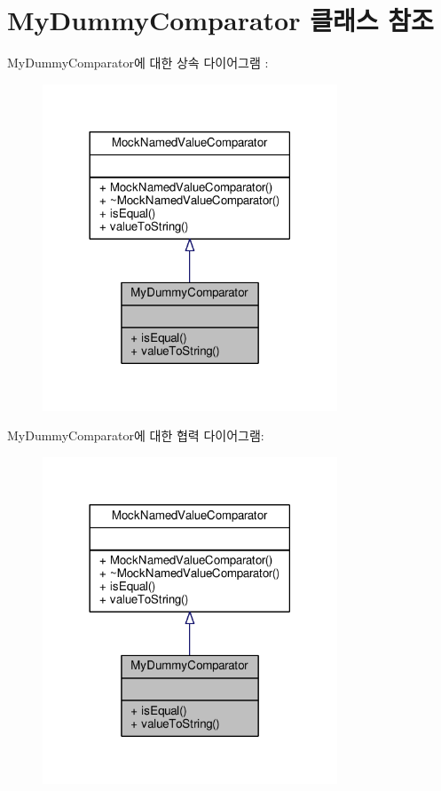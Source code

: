 \hypertarget{class_my_dummy_comparator}{}\section{My\+Dummy\+Comparator 클래스 참조}
\label{class_my_dummy_comparator}


My\+Dummy\+Comparator에 대한 상속 다이어그램 \+: 
\nopagebreak
\begin{figure}[H]
\begin{center}
\leavevmode
\includegraphics[width=249pt]{class_my_dummy_comparator__inherit__graph}
\end{center}
\end{figure}


My\+Dummy\+Comparator에 대한 협력 다이어그램\+:
\nopagebreak
\begin{figure}[H]
\begin{center}
\leavevmode
\includegraphics[width=249pt]{class_my_dummy_comparator__coll__graph}
\end{center}
\end{figure}
